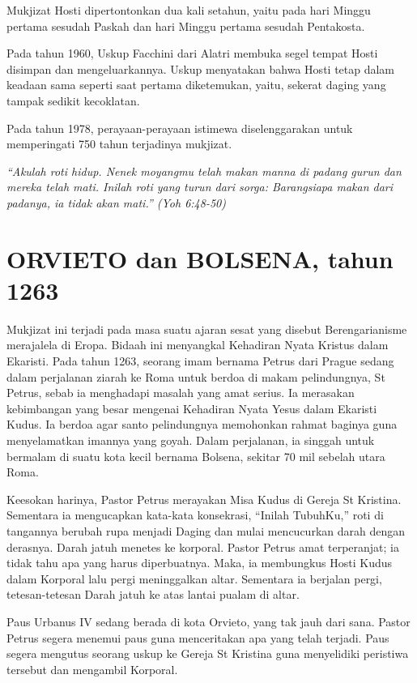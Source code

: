 Mukjizat Hosti dipertontonkan dua kali setahun, yaitu pada hari Minggu pertama sesudah Paskah dan hari Minggu pertama sesudah Pentakosta.

Pada tahun 1960, Uskup Facchini dari  Alatri membuka segel tempat Hosti disimpan dan mengeluarkannya. Uskup menyatakan bahwa Hosti tetap dalam keadaan sama seperti saat pertama diketemukan, yaitu, sekerat daging yang tampak sedikit kecoklatan.

Pada tahun 1978, perayaan-perayaan istimewa diselenggarakan untuk memperingati 750 tahun terjadinya mukjizat.

\textit{``Akulah roti hidup. Nenek moyangmu telah makan manna di padang gurun dan mereka telah mati. Inilah roti yang turun dari sorga: Barangsiapa makan dari padanya, ia tidak akan mati.'' (Yoh 6:48-50)}
 

\section{ORVIETO dan BOLSENA, tahun 1263}

Mukjizat ini terjadi pada masa suatu ajaran sesat yang disebut Berengarianisme merajalela di Eropa. Bidaah ini menyangkal Kehadiran Nyata Kristus dalam Ekaristi. Pada tahun 1263, seorang imam bernama Petrus dari Prague sedang dalam perjalanan ziarah ke Roma untuk berdoa di makam pelindungnya, St Petrus, sebab ia menghadapi masalah yang amat serius. Ia merasakan kebimbangan yang besar mengenai Kehadiran Nyata Yesus dalam Ekaristi Kudus. Ia berdoa agar santo pelindungnya memohonkan rahmat baginya guna menyelamatkan imannya yang goyah. Dalam perjalanan, ia singgah untuk bermalam di suatu kota kecil bernama Bolsena, sekitar 70 mil sebelah utara Roma.

Keesokan harinya, Pastor Petrus merayakan Misa Kudus di Gereja St Kristina. Sementara ia mengucapkan kata-kata konsekrasi, “Inilah TubuhKu,” roti di tangannya berubah rupa menjadi Daging dan mulai mencucurkan darah dengan derasnya. Darah jatuh menetes ke korporal. Pastor Petrus amat terperanjat; ia tidak tahu apa yang harus diperbuatnya. Maka, ia membungkus Hosti Kudus dalam Korporal lalu pergi meninggalkan altar. Sementara ia berjalan pergi, tetesan-tetesan Darah jatuh ke atas lantai pualam di altar.

Paus Urbanus IV sedang berada di kota Orvieto, yang tak jauh dari sana. Pastor Petrus segera menemui paus guna menceritakan apa yang telah terjadi. Paus segera mengutus seorang uskup ke Gereja St Kristina guna menyelidiki peristiwa tersebut dan mengambil Korporal.

